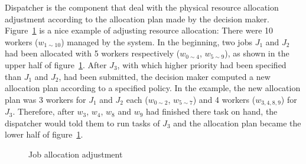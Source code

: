Dispatcher is the component that deal with the physical resource
allocation adjustment according to the allocation plan made by the
decision maker.
Figure~\ref{fig:allocation-adjustment} is a nice example of adjusting
resource allocation: There were 10 workers ($w_{1\sim10}$) managed by
the system.
In the beginning, two jobs $J_1$ and $J_2$ had been allocated with 5
workers respectively ($w_{0\sim4}$, $w_{5\sim9}$), as shown in the upper
half of figure~\ref{fig:allocation-adjustment}.
After $J_3$, with which higher priority had been specified than $J_1$
and $J_2$, had been submitted, the decision maker computed a new
allocation plan according to a specified policy.
In the example, the new allocation plan was 3 workers for $J_1$ and
$J_2$ each ($w_{0\sim2}$, $w_{5\sim7}$) and 4 workers ($w_{3,4,8,9}$)
for $J_3$.
Therefore, after $w_3$, $w_4$, $w_8$ and $ w_9$ had finished there task
on hand, the dispatcher would told them to run tasks of $J_3$ and the
allocation plan became the lower half of
figure~\ref{fig:allocation-adjustment}.

\begin{figure}
  \centering
  
  \caption{Job allocation adjustment}
  \label{fig:allocation-adjustment}
\end{figure}
